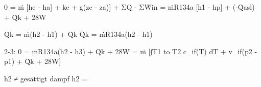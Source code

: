0 = ṁ [he - ha] + ke + g(zc - za)] + ΣQ̇ - ΣẆin  
= ṁR134a [h1 - hp] + (-Q̇asl) + Q̇k + 28W  

Q̇k = ṁ(h2 - h1) + Q̇k  
Q̇k = ṁR134a(h2 - h1)  

2-3:  
0 = ṁR134a(h2 - h3) + Q̇k + 28W  
= ṁ [∫T1 to T2 c_if(T) dT + v_if(p2 - p1) + Q̇k + 28W]  

h2 ≠ gesättigt dampf  
h2 =